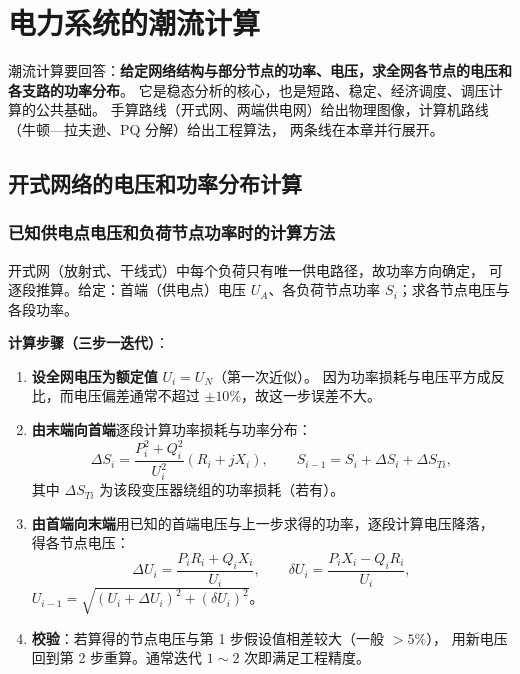 ﻿%

\chapter{电力系统的潮流计算}

潮流计算要回答：\textbf{给定网络结构与部分节点的功率、电压，求全网各节点的电压和各支路的功率分布}。
它是稳态分析的核心，也是短路、稳定、经济调度、调压计算的公共基础。
手算路线（开式网、两端供电网）给出物理图像，计算机路线（牛顿—拉夫逊、PQ 分解）给出工程算法，
两条线在本章并行展开。

\section{开式网络的电压和功率分布计算}

\subsection{已知供电点电压和负荷节点功率时的计算方法}

开式网（放射式、干线式）中每个负荷只有唯一供电路径，故功率方向确定，
可逐段推算。给定：首端（供电点）电压 $U_A$、各负荷节点功率 $S_i$；求各节点电压与各段功率。

\textbf{计算步骤（三步一迭代）}：
\begin{enumerate}
  \item \textbf{设全网电压为额定值} $U_i=U_N$（第一次近似）。
        因为功率损耗与电压平方成反比，而电压偏差通常不超过 $\pm10\%$，故这一步误差不大。
  \item \textbf{由末端向首端}逐段计算功率损耗与功率分布：
        \begin{equation}
          \Delta S_i=\frac{P_i^{2}+Q_i^{2}}{U_i^{2}}\left(R_i+jX_i\right),
          \qquad S_{i-1}=S_i+\Delta S_i+\Delta S_{Ti},
        \end{equation}
        其中 $\Delta S_{Ti}$ 为该段变压器绕组的功率损耗（若有）。
  \item \textbf{由首端向末端}用已知的首端电压与上一步求得的功率，逐段计算电压降落，
        得各节点电压：
        \begin{equation}
          \Delta U_i=\frac{P_iR_i+Q_iX_i}{U_i},\qquad
          \delta U_i=\frac{P_iX_i-Q_iR_i}{U_i},
        \end{equation}
        $U_{i-1}=\sqrt{(U_i+\Delta U_i)^{2}+(\delta U_i)^{2}}$。
  \item \textbf{校验}：若算得的节点电压与第 1 步假设值相差较大（一般 $>5\%$），
        用新电压回到第 2 步重算。通常迭代 $1\sim2$ 次即满足工程精度。
\end{enumerate}


